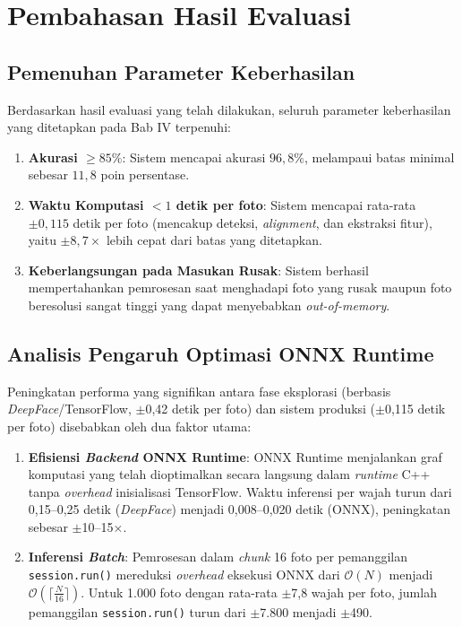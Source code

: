 \section{Pembahasan Hasil Evaluasi}

\subsection{Pemenuhan Parameter Keberhasilan}

Berdasarkan hasil evaluasi yang telah dilakukan, seluruh parameter keberhasilan yang ditetapkan pada Bab IV terpenuhi:

\begin{enumerate}
    \item \textbf{Akurasi $\geq 85\%$}: Sistem mencapai akurasi $96{,}8\%$, melampaui batas minimal sebesar $11{,}8$ poin persentase.

    \item \textbf{Waktu Komputasi $< 1$ detik per foto}: Sistem mencapai rata-rata $\pm 0{,}115$ detik per foto (mencakup deteksi, \textit{alignment}, dan ekstraksi fitur), yaitu $\pm 8{,}7\times$ lebih cepat dari batas yang ditetapkan.

    \item \textbf{Keberlangsungan pada Masukan Rusak}: Sistem berhasil mempertahankan pemrosesan saat menghadapi foto yang rusak maupun foto beresolusi sangat tinggi yang dapat menyebabkan \textit{out-of-memory}.
\end{enumerate}

\subsection{Analisis Pengaruh Optimasi ONNX Runtime}

Peningkatan performa yang signifikan antara fase eksplorasi (berbasis \textit{DeepFace}/TensorFlow, $\pm$0,42 detik per foto) dan sistem produksi ($\pm$0,115 detik per foto) disebabkan oleh dua faktor utama:

\begin{enumerate}
    \item \textbf{Efisiensi \textit{Backend} ONNX Runtime}: ONNX Runtime menjalankan graf komputasi yang telah dioptimalkan secara langsung dalam \textit{runtime} C++ tanpa \textit{overhead} inisialisasi TensorFlow. Waktu inferensi per wajah turun dari 0,15–0,25 detik (\textit{DeepFace}) menjadi 0,008–0,020 detik (ONNX), peningkatan sebesar $\pm$10–15$\times$.

    \item \textbf{Inferensi \textit{Batch}}: Pemrosesan dalam \textit{chunk} 16 foto per pemanggilan \texttt{session.run()} mereduksi \textit{overhead} eksekusi ONNX dari $\mathcal{O}(N)$ menjadi $\mathcal{O}\left(\lceil \frac{N}{16} \rceil\right)$. Untuk 1.000 foto dengan rata-rata $\pm$7,8 wajah per foto, jumlah pemanggilan \texttt{session.run()} turun dari $\pm$7.800 menjadi $\pm$490.
\end{enumerate}

